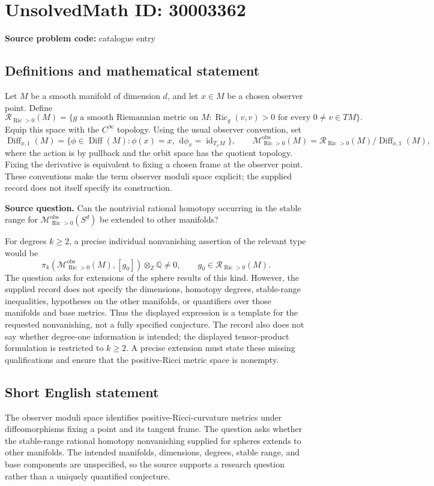 \documentclass[11pt]{article}
\newcommand{\Z}{\mathbb{Z}}
\newcommand{\Q}{\mathbb{Q}}
\newcommand{\dd}{\,\mathrm{d}}
\begin{document}
\section*{UnsolvedMath ID: 30003362}
\textbf{Source problem code:} catalogue entry
\subsection{Definitions and mathematical statement}
Let \(M\) be a smooth manifold of dimension \(d\), and let \(x\in M\) be a chosen observer point. Define
\[
\mathcal R_{\operatorname{Ric}>0}(M)
 =\{g\text{ a smooth Riemannian metric on }M:
 \operatorname{Ric}_g(v,v)>0\text{ for every }0\ne v\in TM\}.
\]
Equip this space with the \(C^\infty\) topology. Using the usual observer convention, set
\[
\operatorname{Diff}_{x,1}(M)
 =\{\phi\in\operatorname{Diff}(M):
 \phi(x)=x,\ \dd\phi_x=\operatorname{id}_{T_xM}\},
\qquad
\mathcal M^{\mathrm{obs}}_{\operatorname{Ric}>0}(M)
 =\mathcal R_{\operatorname{Ric}>0}(M)/\operatorname{Diff}_{x,1}(M),
\]
where the action is by pullback and the orbit space has the quotient topology. Fixing the derivative is equivalent to fixing a chosen frame at the observer point. These conventions make the term observer moduli space explicit; the supplied record does not itself specify its construction.

\textbf{Source question.} Can the nontrivial rational homotopy occurring in the stable range for \(\mathcal M^{\mathrm{obs}}_{\operatorname{Ric}>0}(S^d)\) be extended to other manifolds?

For degrees \(k\ge2\), a precise individual nonvanishing assertion of the relevant type would be
\[
\pi_k\!\left(\mathcal M^{\mathrm{obs}}_{\operatorname{Ric}>0}(M),[g_0]\right)
 \otimes_{\Z}\Q\ne0,
\qquad g_0\in\mathcal R_{\operatorname{Ric}>0}(M).
\]
The question asks for extensions of the sphere results of this kind. However, the supplied record does not specify the dimensions, homotopy degrees, stable-range inequalities, hypotheses on the other manifolds, or quantifiers over those manifolds and base metrics. Thus the displayed expression is a template for the requested nonvanishing, not a fully specified conjecture. The record also does not say whether degree-one information is intended; the displayed tensor-product formulation is restricted to \(k\ge2\). A precise extension must state these missing qualifications and ensure that the positive-Ricci metric space is nonempty.
\subsection{Short English statement}
The observer moduli space identifies positive-Ricci-curvature metrics under diffeomorphisms fixing a point and its tangent frame. The question asks whether the stable-range rational homotopy nonvanishing supplied for spheres extends to other manifolds. The intended manifolds, dimensions, degrees, stable range, and base components are unspecified, so the source supports a research question rather than a uniquely quantified conjecture.
\end{document}
